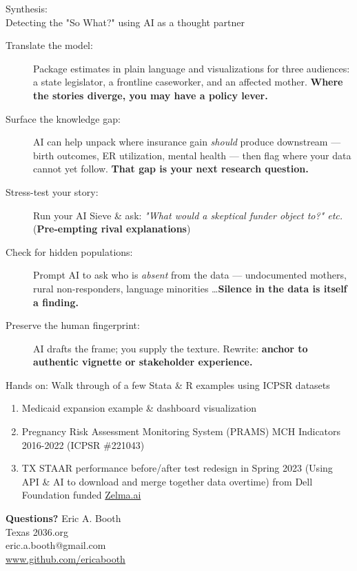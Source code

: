 \documentclass[aspectratio=169, 10pt]{beamer}
\begin{document}
\begin{frame}{Synthesis: \\
Detecting the "So What?" using AI as a thought partner}
\begin{description}
    \item[\textcolor{TXBlue}{Translate the model:}]  Package estimates in plain language and visualizations for three audiences: a state legislator, a frontline caseworker, and an affected mother. \textbf{Where the stories diverge, you may have a policy lever.} \pause

    \item[\textcolor{TXBlue}{Surface the knowledge gap:}] AI can help unpack where insurance gain \textit{should} produce downstream — birth outcomes, ER utilization, mental health — then flag where your data cannot yet follow. \textbf{That gap is your next research question.} \pause

    \item[\textcolor{TXBlue}{Stress-test your story:}] Run your AI Sieve \& ask: \textit{"What would a skeptical funder object to?" etc. } (\textbf{Pre-empting rival explanations}) \pause

    \item[\textcolor{TXBlue}{Check for hidden populations:}] Prompt AI to ask who is \textit{absent} from the data — undocumented mothers, rural non-responders, language minorities \ldots \textbf{Silence in the data is itself a finding.} \pause

    \item[\textcolor{TXBlue}{Preserve the human fingerprint:}] AI drafts the frame; you supply the texture. Rewrite: \textbf{anchor to authentic vignette or stakeholder experience.}
\end{description}
\end{frame}

\begin{frame}[fragile]{Hands on: Walk through of a few Stata \& R examples using ICPSR datasets}
\begin{enumerate}
\item Medicaid expansion example \& dashboard visualization \pause
\item 
Pregnancy Risk Assessment Monitoring System (PRAMS) MCH Indicators 2016-2022 (ICPSR \#221043) \pause
\item TX STAAR performance before/after test redesign in Spring 2023 (Using API \& AI to download and merge together data overtime) from Dell Foundation funded \url{Zelma.ai}
\end{enumerate}
\end{frame}


\begin{frame}[plain]
    \centering
    \huge \color{TXBlue} \textbf{Questions?}
    \vfill
    \large Eric A. Booth \\ [.5em] Texas 2036.org \\[1em]
    \footnotesize eric.a.booth@gmail.com \\
	\url{www.github.com/ericabooth}
\end{frame}
\end{document}
